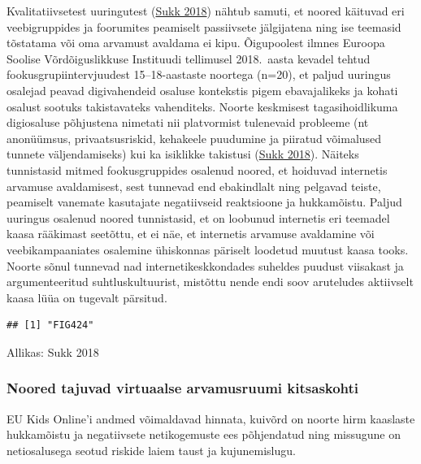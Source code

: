 \documentclass[estonian,]{article}
\begin{document}
Kvalitatiivsetest uuringutest (\protect\hyperlink{Sukk2018}{Sukk 2018}) nähtub samuti, et noored käituvad eri veebigruppides ja foorumites peamiselt passiivsete jälgijatena ning ise teemasid tõstatama või oma arvamust avaldama ei kipu. Õigupoolest ilmnes Euroopa Soolise Võrdõiguslikkuse Instituudi tellimusel 2018.~aasta kevadel tehtud fookusgrupiintervjuudest 15--18-aastaste noortega (n=20), et paljud uuringus osalejad peavad digivahendeid osaluse kontekstis pigem ebavajalikeks ja kohati osalust sootuks takistavateks vahenditeks. Noorte keskmisest tagasihoidlikuma digiosaluse põhjustena nimetati nii platvormist tulenevaid probleeme (nt anonüümsus, privaatsusriskid, kehakeele puudumine ja piiratud võimalused tunnete väljendamiseks) kui ka isiklikke takistusi (\protect\hyperlink{Sukk2018}{Sukk 2018}). Näiteks tunnistasid mitmed fookusgruppides osalenud noored, et hoiduvad internetis arvamuse avaldamisest, sest tunnevad end ebakindlalt ning pelgavad teiste, peamiselt vanemate kasutajate negatiivseid reaktsioone ja hukkamõistu. Paljud uuringus osalenud noored tunnistasid, et on loobunud internetis eri teemadel kaasa rääkimast seetõttu, et ei näe, et internetis arvamuse avaldamine või veebikampaaniates osalemine ühiskonnas päriselt loodetud muutust kaasa tooks. Noorte sõnul tunnevad nad internetikeskkondades suheldes puudust viisakast ja argumenteeritud suhtluskultuurist, mistõttu nende endi soov aruteludes aktiivselt kaasa lüüa on tugevalt pärsitud.

\begin{verbatim}
## [1] "FIG424"
\end{verbatim}

\begin{imgsource}
{Allikas:} Sukk 2018
\end{imgsource}

\hypertarget{noored-tajuvad-virtuaalse-arvamusruumi-kitsaskohti}{%
\subsubsection*{Noored tajuvad virtuaalse arvamusruumi kitsaskohti}\label{noored-tajuvad-virtuaalse-arvamusruumi-kitsaskohti}}

EU Kids Online'i andmed võimaldavad hinnata, kuivõrd on noorte hirm kaaslaste hukkamõistu ja negatiivsete netikogemuste ees põhjendatud ning missugune on netiosalusega seotud riskide laiem taust ja kujunemislugu.
\end{document}
